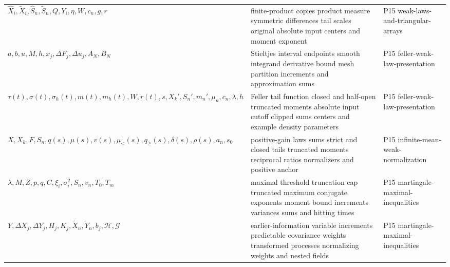 \begin{longtable}{@{}p{}p{}p{}@{}}
\(\widehat X_i,\allowbreak \widetilde X_i,\allowbreak \widehat S_n,\allowbreak \widetilde S_n,\allowbreak Q,\allowbreak Y_i,\allowbreak \eta,\allowbreak W,\allowbreak c_n,\allowbreak g,\allowbreak r\) & finite-product copies product measure symmetric differences tail scales original absolute input centers and moment exponent & P15 weak-\allowbreak{}laws-\allowbreak{}and-\allowbreak{}triangular-\allowbreak{}arrays \\
\(a,\allowbreak b,\allowbreak u,\allowbreak M,\allowbreak h,\allowbreak x_j,\allowbreak \Delta F_j,\allowbreak \Delta u_j,\allowbreak A_N,\allowbreak B_N\) & Stieltjes interval endpoints smooth integrand derivative bound mesh partition increments and approximation sums & P15 feller-\allowbreak{}weak-\allowbreak{}law-\allowbreak{}presentation \\
\(\tau(t),\allowbreak \sigma(t),\allowbreak \sigma_h(t),\allowbreak m(t),\allowbreak m_h(t),\allowbreak W,\allowbreak r(t),\allowbreak s,\allowbreak X_k',\allowbreak S_n',\allowbreak m_n',\allowbreak \mu_n,\allowbreak c_n,\allowbreak \lambda,\allowbreak h\) & Feller tail function closed and half-open truncated moments absolute input cutoff clipped sums centers and example density parameters & P15 feller-\allowbreak{}weak-\allowbreak{}law-\allowbreak{}presentation \\
\(X,\allowbreak X_k,\allowbreak F,\allowbreak S_n,\allowbreak q(s),\allowbreak \mu(s),\allowbreak v(s),\allowbreak \mu_<(s),\allowbreak q_{\geq}(s),\allowbreak \delta(s),\allowbreak \rho(s),\allowbreak a_n,\allowbreak s_0\) & positive-gain laws sums strict and closed tails truncated moments reciprocal ratios normalizers and positive anchor & P15 infinite-\allowbreak{}mean-\allowbreak{}weak-\allowbreak{}normalization \\
\(\lambda,\allowbreak M,\allowbreak Z,\allowbreak p,\allowbreak q,\allowbreak C,\allowbreak \xi_i,\allowbreak \sigma_i^2,\allowbreak S_n,\allowbreak v_n,\allowbreak T_0,\allowbreak T_m\) & maximal threshold truncation cap truncated maximum conjugate exponents moment bound increments variances sums and hitting times & P15 martingale-\allowbreak{}maximal-\allowbreak{}inequalities \\
\(Y,\allowbreak \Delta X_j,\allowbreak \Delta Y_j,\allowbreak H_j,\allowbreak K_j,\allowbreak \widetilde X_n,\allowbreak \widetilde Y_n,\allowbreak b_j,\allowbreak \mathcal H,\allowbreak \mathcal G\) & earlier-information variable increments predictable covariance weights transformed processes normalizing weights and nested fields & P15 martingale-\allowbreak{}maximal-\allowbreak{}inequalities \\

\end{longtable}
